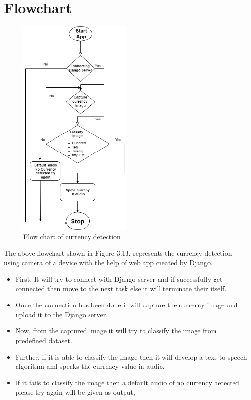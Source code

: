 \section{Flowchart}
\begin{figure}[h!]
    \centering
    \includegraphics[width=0.5\textwidth]{CHAPTERS/f1.jpeg}
    \caption {Flow chart of currency detection}
\end{figure}
\noindent The above flowchart shown in Figure 3.13. represents the currency detection \noindent using camera of a device with the help of web \noindent app created by Django.
\newpage
\begin{itemize}
	\item First, It will try to connect with Django server and if successfully get connected then move to the next task else it will terminate their itself.
	\item Once the connection has been done it will capture the currency image and upload it to the Django server.
	\item Now, from the captured image it will try to classify the image from predefined dataset.
	\item Further, if it is able to classify the image then it will develop a text to speech algorithm and speaks the currency value in audio. 
	\item If it fails to classify the image then a default audio of no currency detected please try again will be given as output,
\end{itemize}
